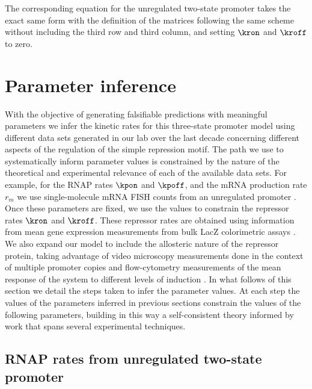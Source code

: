 The corresponding equation for the unregulated two-state promoter takes the
exact same form with the definition of the matrices following the same scheme
without including the third row and third column, and setting $\kron$ and
$\kroff$ to zero.

\section{Parameter inference}\label{supp_param_inference}

With the objective of generating falsifiable predictions with meaningful
parameters we infer the kinetic rates for this three-state promoter model using
different data sets generated in our lab over the last decade concerning
different aspects of the regulation of the simple repression motif. The path
we use to systematically inform parameter values is constrained by the nature
of the theoretical and experimental relevance of each of the available data
sets. For example, for the RNAP rates $\kpon$ and $\kpoff$, and the mRNA
production rate $r_m$ we use single-molecule mRNA FISH counts from an
unregulated promoter \cite{Jones2014a}. Once these parameters are fixed, we use
the values to constrain the repressor rates $\kron$ and $\kroff$. These
repressor rates are obtained using information from mean gene expression
measurements from bulk LacZ colorimetric assays \cite{Garcia2011c}. We also
expand our model to include the allosteric nature of the repressor protein,
taking advantage of video microscopy measurements done in the context of
multiple promoter copies \cite{Brewster2014} and flow-cytometry measurements of
the mean response of the system to different levels of induction
\cite{Razo-Mejia2018}. In what follows of this section we detail the steps
taken to infer the parameter values. At each step the values of the parameters
inferred in previous sections constrain the values of the following parameters,
building in this way a self-consistent theory informed by work that spans
several experimental techniques.

\subsection{RNAP rates from unregulated two-state promoter}

